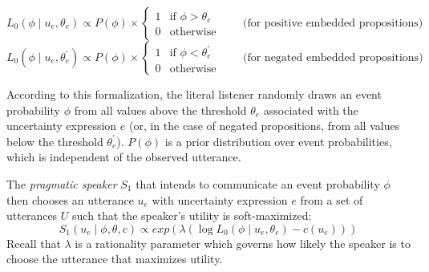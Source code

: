 $$L_0\left(\phi \mid u_e, \theta_e\right) \propto P(\phi) \times 
\begin{cases}
1 & \mbox{if } \phi > \theta_e\\
0 & \mbox{otherwise} 
\end{cases} \qquad \mbox{(for positive embedded propositions)}$$
$$L_0\left(\phi \mid u_e, \theta_e^{'}\right) \propto P(\phi) \times 
\begin{cases}
1 & \mbox{if } \phi < \theta_e^{'} \\
0 & \mbox{otherwise} 
\end{cases} \qquad \mbox{(for negated embedded propositions)}$$

According to this formalization, the {literal listener}  randomly draws an event probability $\phi$ from all values above the threshold $\theta_e$ associated with the uncertainty expression $e$ (or, in the case of negated propositions, from all values below the threshold $\theta_e^{'}$). $P(\phi)$ is a prior distribution over event probabilities, which is independent of the observed utterance.

The \textit{pragmatic speaker} $S_1$ that intends to communicate an event probability $\phi$ then chooses an utterance $u_e$ with uncertainty expression $e$ from a set of utterances $U$ such that the speaker's utility is soft-maximized:
$$S_1\left(u_e \mid \phi, \theta, c\right) \propto exp \left( \lambda \left( \log L_0\left(\phi \mid u_e, \theta_e\right)  - c(u_e)\right)\right)$$
Recall that $\lambda$ is a rationality parameter which governs how likely the {speaker} is to choose the utterance that maximizes utility. 

